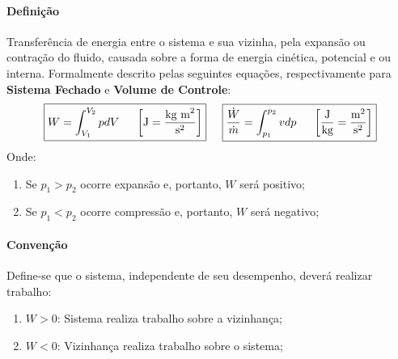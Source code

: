 \documentclass{article}
\begin{document}
            \paragraph{Definição}Transferência de energia entre o sistema e sua vizinha, pela expansão ou contração do fluido, causada sobre a forma de energia cinética, potencial e ou interna. Formalmente descrito pelas seguintes equações, respectivamente para \textbf{Sistema Fechado} e \textbf{Volume de Controle}:
                \[
                    \boxed{
                        W =
                        \int^{V_{2}}_{V_{1}} pdV \hspace{5mm}
                        \left[\text{J} = \frac{\text{kg m}^{2}}{\text{s}^{2}}\right]}
                    \hspace{5mm}
                    \boxed{
                        \frac{\dot{W}}{\dot{m}} =
                        \int^{p_{2}}_{p_{1}} {vdp} \hspace{5mm}
                        \left[\frac{\text{J}}{\text{kg}} = \frac{\text{m}^{2}}{\text{s}^{2}}\right]}
                \]
            Onde:
                \begin{enumerate}[noitemsep]
                    \item Se $p_{1} > p_{2}$ ocorre expansão e, portanto, $W$ será positivo;
                    \item Se $p_{1} < p_{2}$ ocorre compressão e, portanto, $W$ será negativo;
                \end{enumerate}

            \paragraph{Convenção}Define-se que o sistema, independente de seu desempenho, deverá realizar trabalho:
                \begin{enumerate}[noitemsep]
                    \item $W>0$: Sistema realiza trabalho sobre a vizinhança;
                    \item $W<0$: Vizinhança realiza trabalho sobre o sistema;
                \end{enumerate}
\end{document}
